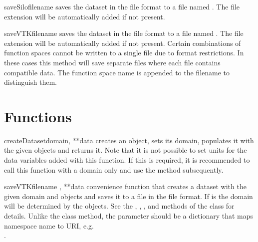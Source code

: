 \begin{methoddesc}[EscriptDataset]{saveSilo}{filename}
    saves the dataset in the \SILO file format to a file named .
    The file extension  will be automatically added if not present.
\end{methoddesc}

\begin{methoddesc}[EscriptDataset]{saveVTK}{filename}
    saves the dataset in the \VTK file format to a file named .
    The file extension  will be automatically added if not present.
    Certain combinations of function spaces cannot be written to a single \VTK
    file due to format restrictions. In these cases this method will save
    separate files where each file contains compatible data.
    The function space name is appended to the filename to distinguish them.
\end{methoddesc}

\section{Functions}\label{sec:weipafuncs}
\begin{funcdesc}{createDataset}{domain, **data}
    creates an  object, sets its domain, populates it
    with the given \Data objects and returns it.
    Note that it is not possible to set units for the data variables added with
    this function. If this is required, it is recommended to call this function
    with a domain only and use the  method subsequently.
\end{funcdesc}

\begin{funcdesc}{saveVTK}{filename , **data}
    convenience function that creates a dataset with the given domain and \Data
    objects and saves it to a file in the \VTK file format.
    If  is  the domain will be determined by the \Data
    objects.
    See the , , , and
     methods of the 
    class for details.
    Unlike the class method, the  parameter should be a
    dictionary that maps namespace name to URI, e.g.\\
    .
\end{funcdesc}

